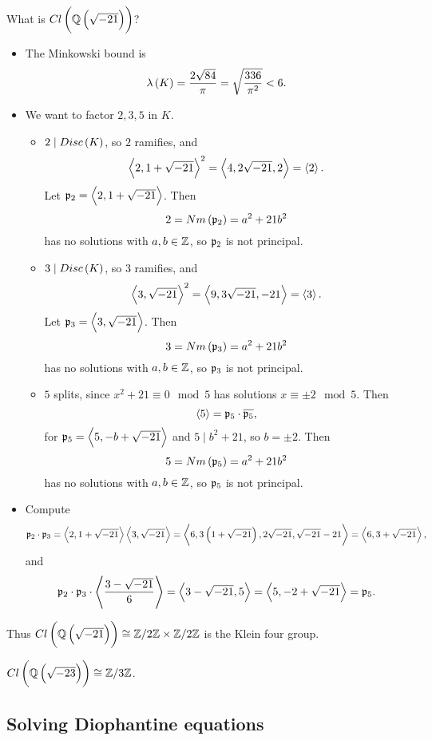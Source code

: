 \pagebreak

\begin{example*}
What is $ Cl\br{\Q\br{\sqrt{-21}}} $?
\begin{itemize}
\item The Minkowski bound is
$$ \lambda\br{K} = \dfrac{2\sqrt{84}}{\pi} = \sqrt{\dfrac{336}{\pi^2}} < 6. $$
\item We want to factor $ 2, 3, 5 $ in $ K $.
\begin{itemize}
\item $ 2 \mid Disc\br{K} $, so $ 2 $ ramifies, and
$$ \left\langle 2, 1 + \sqrt{-21} \right\rangle^2 = \left\langle 4, 2\sqrt{-21}, 2 \right\rangle = \left\langle 2 \right\rangle. $$
Let $ \mathfrak{p}_2 = \left\langle 2, 1 + \sqrt{-21} \right\rangle $. Then
$$ 2 = Nm\br{\pp_2} = a^2 + 21b^2 $$
has no solutions with $ a, b \in \mathbb{Z} $, so $ \mathfrak{p}_2 $ is not principal.
\item $ 3 \mid Disc\br{K} $, so $ 3 $ ramifies, and
$$ \left\langle 3, \sqrt{-21} \right\rangle^2 = \left\langle 9, 3\sqrt{-21}, -21 \right\rangle = \left\langle 3 \right\rangle. $$
Let $ \mathfrak{p}_3 = \left\langle 3, \sqrt{-21} \right\rangle $. Then
$$ 3 = Nm\br{\pp_3} = a^2 + 21b^2 $$
has no solutions with $ a, b \in \mathbb{Z} $, so $ \mathfrak{p}_3 $ is not principal.
\item $ 5 $ splits, since $ x^2 + 21 \equiv 0 \mod 5 $ has solutions $ x \equiv \pm 2 \mod 5 $. Then
$$ \left\langle 5 \right\rangle = \mathfrak{p}_5 \cdot \overline{\mathfrak{p}_5}, $$
for $ \mathfrak{p}_5 = \left\langle 5, -b + \sqrt{-21} \right\rangle $ and $ 5 \mid b^2 + 21 $, so $ b = \pm 2 $. Then
$$ 5 = Nm\br{\pp_5} = a^2 + 21b^2 $$
has no solutions with $ a, b \in \mathbb{Z} $, so $ \mathfrak{p}_5 $ is not principal.
\end{itemize}
\item Compute
$$ \pp_2 \cdot \pp_3 = \abr{2, 1 + \sqrt{-21}}\abr{3, \sqrt{-21}} = \abr{6, 3\br{1 + \sqrt{-21}}, 2\sqrt{-21}, \sqrt{-21} - 21} = \abr{6, 3 + \sqrt{-21}}, $$
and
$$ \mathfrak{p}_2 \cdot \mathfrak{p}_3 \cdot \left\langle \dfrac{3 - \sqrt{-21}}{6} \right\rangle = \left\langle 3 - \sqrt{-21}, 5 \right\rangle = \left\langle 5, -2 + \sqrt{-21} \right\rangle = \mathfrak{p}_5. $$
\end{itemize}
Thus $ Cl\br{\Q\br{\sqrt{-21}}} \cong \Z / 2\Z \times \Z / 2\Z $ is the Klein four group.
\end{example*}

\begin{example*}
$ Cl\br{\Q\br{\sqrt{-23}}} \cong \Z / 3\Z $.
\end{example*}

\pagebreak

\subsection{Solving Diophantine equations}

